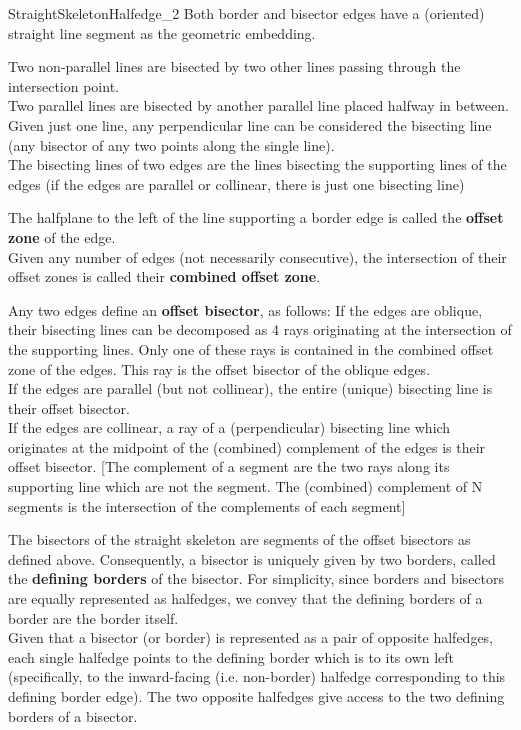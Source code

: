 \begin{ccRefConcept}{StraightSkeletonHalfedge_2}
Both border and bisector edges have a (oriented) straight line segment as the geometric embedding.

Two non-parallel lines are bisected by two other lines passing through the intersection point.\\ Two parallel lines are bisected by another parallel line placed halfway in between.\\
Given just one line, any perpendicular line can be considered the bisecting line (any bisector of any two points along the single line).\\
The bisecting lines of two edges are the lines bisecting the supporting lines of the edges (if the edges are parallel or collinear, there is just one bisecting line)

The halfplane to the left of the line supporting a border edge is called the \textbf{offset zone} of the edge.\\
Given any number of edges (not necessarily consecutive), the intersection of their offset zones is called their \textbf{combined offset zone}.

Any two edges define an \textbf{offset bisector}, as follows:
If the edges are oblique, their bisecting lines can be decomposed as 4 rays originating at the intersection of the supporting lines. Only one of these rays is contained in the combined offset zone of the edges. This ray is the offset bisector of the oblique edges.\\
If the edges are parallel (but not collinear), the entire (unique) bisecting line is their offset bisector.\\
If the edges are collinear, a ray of a (perpendicular) bisecting line which originates at the midpoint of the (combined) complement of the edges is their offset bisector. [The complement of a segment are the two rays along its supporting line which are not the segment. The (combined) complement of N segments is the intersection of the complements of each segment]


The bisectors of the straight skeleton are segments of the offset bisectors as defined above. Consequently, a bisector is uniquely given by two borders, called the \textbf{defining borders} of the bisector. For simplicity, since borders and bisectors are equally represented as halfedges, we convey that the defining borders of a border are the border itself.\\
Given that a bisector (or border) is represented as a pair of opposite halfedges, each single halfedge points to the defining border which is to its own left (specifically, to the inward-facing (i.e. non-border) halfedge corresponding to this defining border edge). The two opposite halfedges give access to the two defining borders of a bisector.


\end{ccRefConcept}
